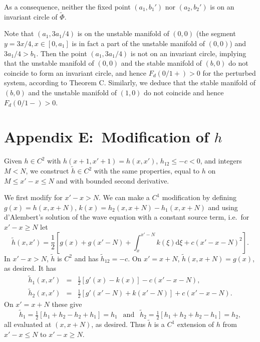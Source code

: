 \documentclass[12pt]{article}
\newcounter{number}
\renewcommand{\thelemma}{\thesection.\thenumber}
\renewcommand{\theequation}{\arabic{section}.\arabic{equation}}
\begin{document}
As a consequence, neither the fixed point $(a_1,b_1')$ nor $(a_2, b_2')$ is  on an invariant circle of $\tilde{\Phi}$.


Note that $(a_1,3a_1/4)$ is on the unstable manifold of $(0,0)$ (the segment $y=3x/4, x\in[0,a_1]$ is in fact a part of the unstable manifold of $(0,0)$) and $3a_1/4>b_1$. Then the point $(a_1,3a_1/4)$ is not on an invariant circle, implying that the unstable manifold of $(0,0)$ and the stable manifold of $(b,0)$ do not coincide to form an invariant circle, and hence $F_d(0/1+)>0$ for the perturbed system, according to Theorem C. Similarly, we deduce that the stable  manifold of $(b,0)$ and the unstable manifold of $(1,0)$ do not coincide and hence $F_d(0/1-)>0$.




\section*{Appendix E:~Modification of $h$}
\label{sec:appE}
 \setcounter{theorem}{0}
 \setcounter{equation}{0}
 \setcounter{lemma}{0}
 \renewcommand{\theequation}{E.\arabic{equation}}
\renewcommand{\thelemma}{E.\arabic{lemma}}

Given $h \in C^2$ with $h(x+1,x'+1)=h(x,x')$, $h_{12}\le-c<0$, and integers $M<N$, we construct $\tilde{h} \in C^2$ with the same properties, equal to $h$ on $M\le x'-x\le N$ and with bounded second derivative.

We first modify for $x'-x>N$.  We can make a $C^1$ modification by defining $g(x)=h(x,x+N)$, $k(x)=h_2(x,x+N)-h_1(x,x+N)$ and using d'Alembert's solution of the wave equation with a constant source term, i.e.~for $x'-x\ge N$ let
$$\tilde{h}(x,x') = \frac12\left[g(x)+g(x'-N)+\int_x^{x'-N} k(\xi)\mbox{d}\xi + c(x'-x-N)^2\right].$$
In $x'-x> N$, $\tilde{h}$ is $C^2$ and has $\tilde{h}_{12} = -c$.
On $x'=x+N$, $\tilde{h}(x,x+N) = g(x)$, as desired.
It has
\begin{eqnarray}
\tilde{h}_1(x,x') &=& \tfrac12\left[g'(x) - k(x)\right]-c(x'-x-N), \nonumber\\
\tilde{h}_2(x,x') &=& \tfrac12\left[g'(x'-N)+k(x'-N)\right]+c(x'-x-N).\nonumber
\end{eqnarray}
On $x'=x+N$ these give
$$
\tilde{h}_1 = \tfrac12[h_1+h_2-h_2+h_1] = h_1\ \ \mbox{ and }\ \ \tilde{h}_2 = \tfrac12[h_1+h_2+h_2-h_1]=h_2,
 $$
 all evaluated at $(x,x+N)$, as desired.   Thus $\tilde{h}$ is a $C^1$ extension of $h$ from $x' -x\le N$ to $x'-x\ge N$.
\end{document}
